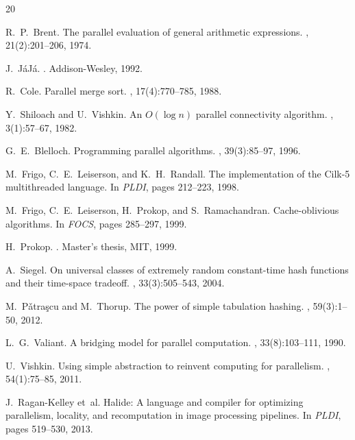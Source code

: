 \documentclass[11pt]{article}
\begin{document}

\begin{thebibliography}{20}

R.~P.~Brent.
\newblock The parallel evaluation of general arithmetic expressions.
, 21(2):201--206, 1974.

J.~J\'aJ\'a.
.
\newblock Addison-Wesley, 1992.

R.~Cole.
\newblock Parallel merge sort.
, 17(4):770--785, 1988.

Y.~Shiloach and U.~Vishkin.
\newblock An {$O(\log n)$} parallel connectivity algorithm.
, 3(1):57--67, 1982.

G.~E.~Blelloch.
\newblock Programming parallel algorithms.
, 39(3):85--97, 1996.

M.~Frigo, C.~E.~Leiserson, and K.~H.~Randall.
\newblock The implementation of the Cilk-5 multithreaded language.
\newblock In {\em PLDI}, pages 212--223, 1998.

M.~Frigo, C.~E.~Leiserson, H.~Prokop, and S.~Ramachandran.
\newblock Cache-oblivious algorithms.
\newblock In {\em FOCS}, pages 285--297, 1999.

H.~Prokop.
.
\newblock Master's thesis, MIT, 1999.

A.~Siegel.
\newblock On universal classes of extremely random constant-time hash
  functions and their time-space tradeoff.
, 33(3):505--543, 2004.

M.~P\v{a}tra\c{s}cu and M.~Thorup.
\newblock The power of simple tabulation hashing.
, 59(3):1--50, 2012.

L.~G.~Valiant.
\newblock A bridging model for parallel computation.
, 33(8):103--111, 1990.

U.~Vishkin.
\newblock Using simple abstraction to reinvent computing for parallelism.
, 54(1):75--85, 2011.

J.~Ragan-Kelley et~al.
\newblock Halide: A language and compiler for optimizing parallelism,
  locality, and recomputation in image processing pipelines.
\newblock In {\em PLDI}, pages 519--530, 2013.


\end{thebibliography}
\end{document}
